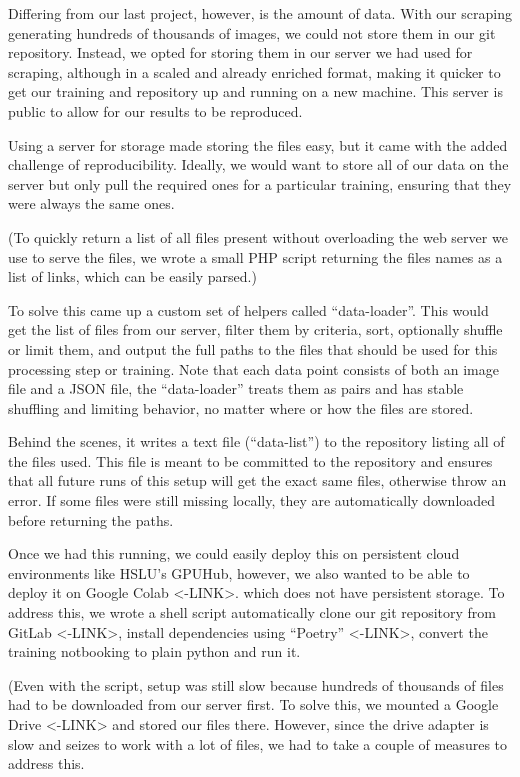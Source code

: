 \documentclass{article}
\begin{document}
Differing from our last project, however, is the amount of data. With
our scraping generating hundreds of thousands of images, we could not
store them in our git repository. Instead, we opted for storing them in
our server we had used for scraping, although in a scaled and already
enriched format, making it quicker to get our training and repository up
and running on a new machine. This server is public to allow for our
results to be reproduced.

Using a server for storage made storing the files easy, but it came with
the added challenge of reproducibility. Ideally, we would want to store
all of our data on the server but only pull the required ones for a
particular training, ensuring that they were always the same ones.

(To quickly return a list of all files present without overloading the
web server we use to serve the files, we wrote a small PHP script
returning the files names as a list of links, which can be easily
parsed.)

To solve this came up a custom set of helpers called ``data-loader''.
This would get the list of files from our server, filter them by
criteria, sort, optionally shuffle or limit them, and output the full
paths to the files that should be used for this processing step or
training. Note that each data point consists of both an image file and a
JSON file, the ``data-loader'' treats them as pairs and has stable
shuffling and limiting behavior, no matter where or how the files are
stored.

Behind the scenes, it writes a text file (``data-list'') to the
repository listing all of the files used. This file is meant to be
committed to the repository and ensures that all future runs of this
setup will get the exact same files, otherwise throw an error. If some
files were still missing locally, they are automatically downloaded
before returning the paths.

Once we had this running, we could easily deploy this on persistent
cloud environments like HSLU's GPUHub, however, we also wanted to be
able to deploy it on Google Colab \textless-LINK\textgreater. which does
not have persistent storage. To address this, we wrote a shell script
automatically clone our git repository from GitLab
\textless-LINK\textgreater, install dependencies using ``Poetry''
\textless-LINK\textgreater, convert the training notbooking to plain
python and run it.

(Even with the script, setup was still slow because hundreds of
thousands of files had to be downloaded from our server first. To solve
this, we mounted a Google Drive \textless-LINK\textgreater{} and stored
our files there. However, since the drive adapter is slow and seizes to
work with a lot of files, we had to take a couple of measures to address
this.
\end{document}
